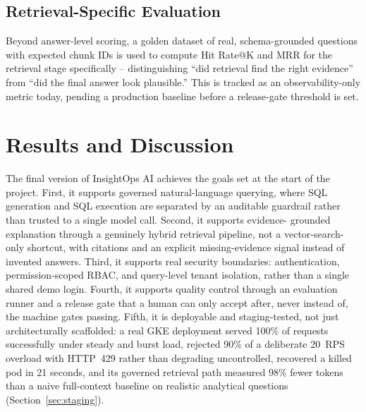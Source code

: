 \documentclass[conference]{IEEEtran}
\begin{document}
\subsection{Retrieval-Specific Evaluation}
Beyond answer-level scoring, a golden dataset of real, schema-grounded
questions with expected chunk IDs is used to compute Hit Rate@K and MRR
for the retrieval stage specifically -- distinguishing ``did retrieval find
the right evidence'' from ``did the final answer look plausible.'' This is
tracked as an observability-only metric today, pending a production
baseline before a release-gate threshold is set.

\section{Results and Discussion}

The final version of InsightOps AI achieves the goals set at the start of
the project. First, it supports governed natural-language querying, where
SQL generation and SQL execution are separated by an auditable guardrail
rather than trusted to a single model call. Second, it supports evidence-
grounded explanation through a genuinely hybrid retrieval pipeline, not a
vector-search-only shortcut, with citations and an explicit
missing-evidence signal instead of invented answers. Third, it supports
real security boundaries: authentication, permission-scoped RBAC, and
query-level tenant isolation, rather than a single shared demo login.
Fourth, it supports quality control through an evaluation runner and a
release gate that a human can only accept after, never instead of, the
machine gates passing. Fifth, it is deployable and staging-tested, not
just architecturally scaffolded: a real GKE deployment served 100\% of
requests successfully under steady and burst load, rejected 90\% of a
deliberate 20~RPS overload with HTTP~429 rather than degrading
uncontrolled, recovered a killed pod in 21 seconds, and its governed
retrieval path measured 98\% fewer tokens than a naive full-context
baseline on realistic analytical questions (Section~\ref{sec:staging}).
\end{document}
